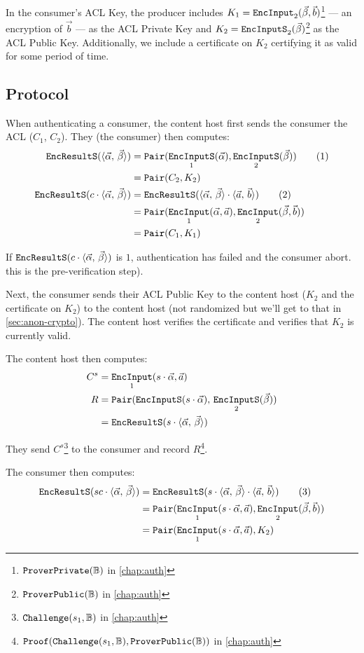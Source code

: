 \documentclass[pdftex,12pt,a4papaer,twoside,notitlepage]{report}
\newcommand{\iprod}[2]{\langle #1,\,#2\rangle}
\DeclareMathOperator{\ein}{\mathtt{EncInput}}
\DeclareMathOperator{\eins}{\mathtt{EncInputS}}
\DeclareMathOperator{\eouts}{\mathtt{EncResultS}}
\DeclareMathOperator{\pair}{\mathtt{Pair}}
\DeclareMathOperator{\Proof}{\mathtt{Proof}}
\begin{document}
In the consumer's ACL Key, the producer includes $K_1 = \ein_2(\Bp,
\vec{b})$\footnote{$\operatorname{\mathtt{ProverPrivate}}(\mathbb{B})$ in \cref{chap:auth}} --- an encryption of $\vec{b}$ ---
as the ACL Private Key and $K_2 = \eins_2(\Bp)$\footnote{$\operatorname{\mathtt{ProverPublic}}(\mathbb{B})$ in
  \cref{chap:auth}} as the ACL Public Key. Additionally, we include a certificate
  on $K_2$ certifying it as valid for some period of time.

\subsection{Protocol}

When authenticating a consumer, the content host first sends the consumer the
ACL ($C_1$, $C_2$). They (the consumer) then computes:
\begin{align*}
  \eouts(\ABp)          &= \pair(\eins_1(\Ap), \eins_2(\Bp)) \tag{1} \\
                        &= \pair(C_2, K_2) \\
  \eouts(c \cdot \ABp)  &= \eouts(\ABp \cdot \iprod{\vec{a}}{\vec{b}}) \tag{2} \\
                        &= \pair(\ein_1(\Ap, \vec{a}), \ein_2(\Bp, \vec{b})) \\
                        &= \pair(C_1, K_1) \\
\end{align*}

If $\eouts(c \cdot \ABp)$ is $1$, authentication has failed and the consumer
abort. this is the pre-verification step).

Next, the consumer sends their ACL Public Key to the content host ($K_2$ and the
certificate on $K_2$) to the content host (not randomized but we'll get to that
in \cref{sec:anon-crypto}). The content host verifies the certificate and
verifies that $K_2$ is currently valid.

The content host then computes:
\begin{align*}
  C^s &= \ein_1(s\cdot\Ap, \vec{a}) \\
  R   &= \pair(\eins(s\cdot \Ap),\,\eins_2(\Bp)) \\
      &= \eouts(s\cdot \ABp)
\end{align*}


They send $C^s$\footnote{$\operatorname{\mathtt{Challenge}}(s_1, \mathbb{B})$ in \cref{chap:auth}} to the consumer and record
$R$\footnote{$\Proof(\Cv, \Pv)$ in \cref{chap:auth}}.

The consumer then computes:
\begin{align*}
  \eouts(sc \cdot \ABp) &= \eouts(s \cdot \ABp \cdot \iprod{\vec{a}}{\vec{b}}) \tag{3} \\
                        &= \pair(\ein_1(s \cdot \Ap, \vec{a}), \ein_2(\Bp, \vec{b})) \\
                        &= \pair(\ein_1(s \cdot \Ap, \vec{a}), K_2) \\
\end{align*}
\end{document}
